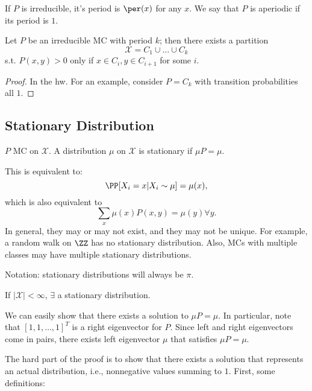 \begin{definition}

If $P$ is irreducible, it's period is $\per(x)$ for any $x$. We say that $P$ is \ac{aperiodic} if its period is $1$. 
\end{definition}

\begin{theorem}
\proplabel

Let $P$ be an irreducible MC with period $k$; then there exists a partition 
\[\mathcal{X}=C_1\cup \hdots \cup C_k\] 
s.t. $P(x,y)>0$ only if $x\in C_i,y\in C_{i+1}$ for some $i$. 
\end{theorem}

\begin{proof}
In the hw. For an example, consider $P=C_k$ with transition probabilities all $1$. 
\end{proof}

\subsection{Stationary Distribution}

\begin{definition}

$P$ MC on $\mathcal{X}$. A distribution $\mu$ on $\mathcal{X}$ is \ac{stationary} if $\mu P=\mu$. 
\end{definition}
This is equivalent to: 
\[\PP[X_i=x|X_i\sim \mu]=\mu(x),\]
which is also equivalent to
\[\sum_x \mu(x)P(x,y)=\mu(y)\forall y.\]
In general, they may or may not exist, and they may not be unique. For example, a random walk on $\ZZ$ has no stationary distribution. Also, MCs with multiple classes may have multiple stationary distributions.

Notation: stationary distributions will always be $\pi$. 

\begin{theorem}
\thmlabel

If $\vert \mathcal{X}\vert < \infty$, $\exists$ a stationary distribution. 
\end{theorem}

We can easily show that there exists a solution to $\mu P=\mu$. In particular, note that $[1,1,\hdots, 1]^T$ is a right eigenvector for $P$. Since left and right eigenvectors come in pairs, there exists left eigenvector $\mu$ that satisfies $\mu P=\mu$. 

The hard part of the proof is to show that there exists a solution that represents an actual distribution, i.e., nonnegative values summing to $1$. First, some definitions: 

